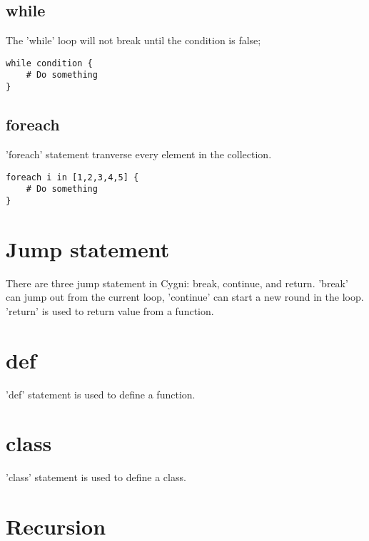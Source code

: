 \subsection{while}
The 'while' loop will not break until the condition is false;
\begin{lstlisting}
while condition {
	# Do something
}
\end{lstlisting}

\subsection{foreach}
'foreach' statement tranverse every element in the collection.
\begin{lstlisting}
foreach i in [1,2,3,4,5] {
	# Do something
}
\end{lstlisting}

\section{Jump statement}
There are three jump statement in Cygni: break, continue, and return. 'break' can jump out from the current loop, 'continue' can start a new round in the loop. 'return' is used to return value from a function.

\section{def}
'def' statement is used to define a function.

\section{class}
'class' statement is used to define a class.

\section{Recursion}

